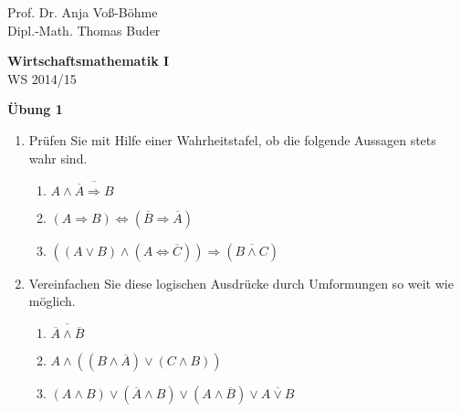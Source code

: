 \documentclass[12pt,a4paper]{scrreprt}
\begin{document}
 
\begin{flushleft}
Prof. Dr. Anja Voß-Böhme \\
Dipl.-Math. Thomas Buder
\end{flushleft}

\begin{center}
\large{\textbf{ Wirtschaftsmathematik I}} \\
WS 2014/15 \end{center}

\begin{center}\large{\textbf{ Übung 1 }} \end{center}

\bigskip
\begin{enumerate}

 	\item 	Prüfen Sie mit Hilfe einer Wahrheitstafel, ob die folgende Aussagen stets wahr sind.

	\begin{enumerate}
	 	\item   $A \wedge \overline{\overline{A} \Rightarrow B} $
\begin{comment}
\begin{tabular}{lllll}
$A$ & $B$ & $\overline{A}$ & $\overline{\overline{A} \Rightarrow B}$ & $A \wedge \overline{\overline{A} \Rightarrow B}$ \\
1 & 1 & 0 & 	\\
1 & 0 & 0 & 	\\
0 & 1 & 1 & 	\\
0 & 0 & 1 & 
\end{tabular}
\end{comment}

		\item   $(A \Rightarrow B) \Leftrightarrow ( \overline{B} \Rightarrow \overline{A}) $
		\item   $\left( (A \vee B) \wedge ( A \Leftrightarrow \overline{C})\right)  \Rightarrow ( \overline{B \wedge C}) $
	\end{enumerate}

	\item Vereinfachen Sie diese logischen Ausdrücke durch Umformungen so weit wie möglich.
	
	\begin{enumerate}
		\item   $\overline{ \overline{A} \wedge \overline{B}}$
	 	\item   $A \wedge \left( ( B \wedge \overline{A} ) \vee (C \wedge B) \right) $
		\item $(A \wedge B) \vee (\overline{A} \wedge B) \vee (A \wedge \overline{B}) \vee \overline{ A \vee  B}$
	\end{enumerate}
	

\end{enumerate}
\end{document}
